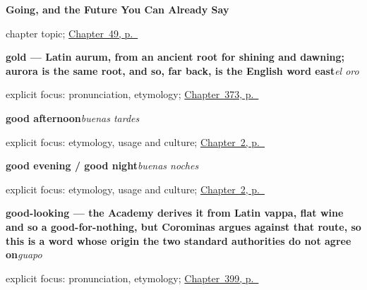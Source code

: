 \noindent\begin{minipage}[t]{\linewidth}
\raggedright
\textbf{Going, and the Future You Can Already Say}\par
\footnotesize chapter topic; \hyperref[ch:ir-y-futuro]{Chapter~49, p.~\pageref*{ch:ir-y-futuro}}
\end{minipage}\par\smallskip

\noindent\begin{minipage}[t]{\linewidth}
\raggedright
\textbf{gold — Latin aurum, from an ancient root for shining and dawning; aurora is the same root, and so, far back, is the English word east}\enspace\emph{el oro}\par
\footnotesize explicit focus: pronunciation, etymology; \hyperref[ch:el-oro-y-la-botella]{Chapter~373, p.~\pageref*{ch:el-oro-y-la-botella}}
\end{minipage}\par\smallskip

\noindent\begin{minipage}[t]{\linewidth}
\raggedright
\textbf{good afternoon}\enspace\emph{buenas tardes}\par
\footnotesize explicit focus: etymology, usage and culture; \hyperref[ch:greetings]{Chapter~2, p.~\pageref*{ch:greetings}}
\end{minipage}\par\smallskip

\noindent\begin{minipage}[t]{\linewidth}
\raggedright
\textbf{good evening / good night}\enspace\emph{buenas noches}\par
\footnotesize explicit focus: etymology, usage and culture; \hyperref[ch:greetings]{Chapter~2, p.~\pageref*{ch:greetings}}
\end{minipage}\par\smallskip

\noindent\begin{minipage}[t]{\linewidth}
\raggedright
\textbf{good-looking — the Academy derives it from Latin vappa, flat wine and so a good-for-nothing, but Corominas argues against that route, so this is a word whose origin the two standard authorities do not agree on}\enspace\emph{guapo}\par
\footnotesize explicit focus: pronunciation, etymology; \hyperref[ch:bonito-y-guapo]{Chapter~399, p.~\pageref*{ch:bonito-y-guapo}}
\end{minipage}\par\smallskip

